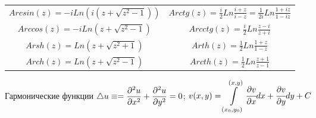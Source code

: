 \vspace{1ex}
\noindent
\begin{tabular}{|c|c|}
	\hline
	$\displaystyle Arcsin(z) = -iLn(i(z + \sqrt{z^2 - 1}))$ &
	$\displaystyle Arctg(z) = \frac{i}{2}Ln\frac{i+z}{i-z} = \frac{1}{2i}Ln\frac{1+iz}{1-iz}$ \\

	$\displaystyle Arccos(z) = -iLn(z + \sqrt{z^2-1})$ &
	$\displaystyle Arcctg(z) = \frac{i}{2}Ln\frac{z-i}{z+i}$ \\

	\hline

	$\displaystyle Arsh(z) = Ln(z+\sqrt{z^2 + 1})$ &
	$\displaystyle Arth(z) = \frac{1}{2}Ln\frac{1+z}{1-z}$ \\

	$\displaystyle Arch(z) = Ln(z+\sqrt{z^2 - 1})$ &
	$\displaystyle Arcth(z) = \frac{1}{2}Ln\frac{z+1}{z-1}$ \\
	\hline
\end{tabular}

\noindent
Гармонические функции
$\displaystyle \mathop{}\!\mathbin\bigtriangleup{u}\equiv =
\frac{\partial^2u}{\partial x^2} + \frac{\partial^2u}{\partial y^2} = 0$; \vspace{1em}
$\displaystyle v(x, y) = \int\limits_{(x_0, y_0)}^{(x, y)} \cfrac{\partial v}{\partial x} dx + \cfrac{\partial v}{\partial y} dy + C$



